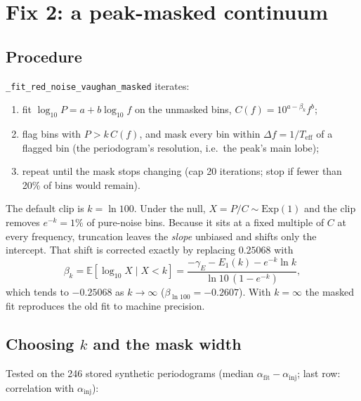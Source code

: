 \documentclass[11pt]{article}
\newcommand{\code}[1]{\texttt{#1}}
\begin{document}
\section{Fix 2: a peak-masked continuum}

\subsection{Procedure}

\code{\_fit\_red\_noise\_vaughan\_masked} iterates:
\begin{enumerate}
\item fit $\log_{10}P = a + b\log_{10}f$ on the unmasked bins, $C(f) = 10^{a-\beta_k} f^{b}$;
\item flag bins with $P > k\,C(f)$, and mask every bin within $\Delta f = 1/T_\mathrm{eff}$
  of a flagged bin (the periodogram's resolution, i.e.\ the peak's main lobe);
\item repeat until the mask stops changing (cap 20 iterations; stop if fewer than 20\% of
  bins would remain).
\end{enumerate}
The default clip is $k = \ln 100$. Under the null, $X = P/C \sim \mathrm{Exp}(1)$ and the
clip removes $e^{-k} = 1\%$ of pure-noise bins. Because it sits at a fixed multiple of $C$
at every frequency, truncation leaves the \emph{slope} unbiased and shifts only the
intercept. That shift is corrected exactly by replacing $0.25068$ with
\begin{equation}
\beta_k = \mathbb{E}[\log_{10}X \mid X<k]
 = \frac{-\gamma_E - E_1(k) - e^{-k}\ln k}{\ln 10\,(1-e^{-k})},
\end{equation}
which tends to $-0.25068$ as $k\to\infty$ ($\beta_{\ln 100} = -0.2607$). With
$k = \infty$ the masked fit reproduces the old fit to machine precision.

\subsection{Choosing $k$ and the mask width}

Tested on the 246 stored synthetic periodograms (median $\alpha_\mathrm{fit} -
\alpha_\mathrm{inj}$; last row: correlation with $\alpha_\mathrm{inj}$):
\end{document}
